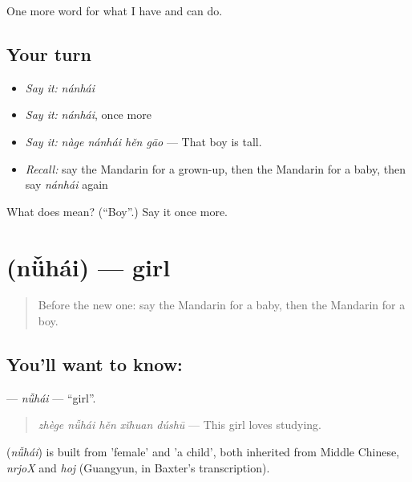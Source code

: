 \begin{grammarlens}[title={What you've built}]
One more word for what I have and can do.
\end{grammarlens}

\subsection*{Your turn}
\begin{itemize}
\raggedright
  \item \emph{Say it:} \emph{nánhái}
  \item \emph{Say it:} \emph{nánhái}, once more
  \item \emph{Say it:} \emph{nàge nánhái hěn gāo} — That boy is tall.
  \item \emph{Recall:} say the Mandarin for a grown-up, then the Mandarin for a baby, then say \emph{nánhái} again
\end{itemize}

\begin{tcolorbox}[breakable,colback=teal!4,colframe=teal!35!black,title={Before you move on}]
What does  mean? (\textquotedblleft{}Boy\textquotedblright{}.) Say it once more.
\end{tcolorbox}
\section[\texorpdfstring{\zh{女孩} (nǚhái)}{女孩 (nǚhái)}]{ (nǚhái) — girl}

\label{lesson:ZH-C266-nuhai}



\begin{quote}
Before the new one: say the Mandarin for a baby, then the Mandarin for a boy.
\end{quote}

\subsection*{You'll want to know: }
\textbf{} — \emph{nǚhái} — \textquotedblleft{}girl\textquotedblright{}.

\begin{quote}
\textbf{} \emph{zhège nǚhái hěn xǐhuan dúshū} — This girl loves studying.
\end{quote}

\begin{cousinweb}
\textbf{} (\emph{nǚhái}) is built from  'female' and  'a child', both inherited from Middle Chinese, \emph{nrjoX} and \emph{hoj} (Guangyun, in Baxter's transcription).
\end{cousinweb}

